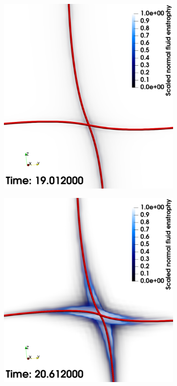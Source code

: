 \documentclass[%
 reprint,
 amsmath,amssymb,
 aps,
 prl,
]{revtex4-2}
\begin{document}
\begin{figure}
	\centering
	\begin{subfigure}[b]{0.24\textwidth}
		\centering
		\includegraphics*[width=\textwidth]{snap-1.pdf}
	\end{subfigure}
	\begin{subfigure}[b]{0.24\textwidth}
		\centering
		\includegraphics*[width=\textwidth]{snap-2.pdf}

\end{subfigure}
\end{figure}
\end{document}
